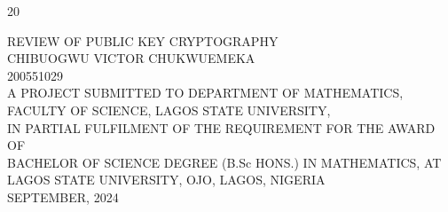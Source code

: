 \documentclass[12pt]{report}
\numberwithin{equation}{chapter}
\begin{document}
 
	       \fontsize{12}
           {20}\selectfont
			\begin{titlepage}
				\begin{center}
					\vspace*{3.5cm}
					\large{REVIEW OF PUBLIC KEY CRYPTOGRAPHY}\\
					\vspace{5cm}
					\large {CHIBUOGWU VICTOR CHUKWUEMEKA}\\
				\vspace{0.2cm}
				\small {200551029}\\
			\vspace{4cm}
             A PROJECT SUBMITTED TO DEPARTMENT OF MATHEMATICS,\\
             \vspace{0.2cm}
                FACULTY OF SCIENCE, LAGOS STATE UNIVERSITY,\\
                \vspace{0.2cm}
			IN PARTIAL FULFILMENT OF THE REQUIREMENT FOR THE AWARD OF
			\vspace{0.2cm}\\
			BACHELOR OF SCIENCE DEGREE (B.Sc HONS.) IN MATHEMATICS,
			\vspace{0.2cm}
			AT LAGOS STATE UNIVERSITY, OJO, LAGOS, NIGERIA\\
			\vspace{1cm}
			{SEPTEMBER, 2024}\\			
	\end{center}
	
\end{titlepage}
\end{document}
